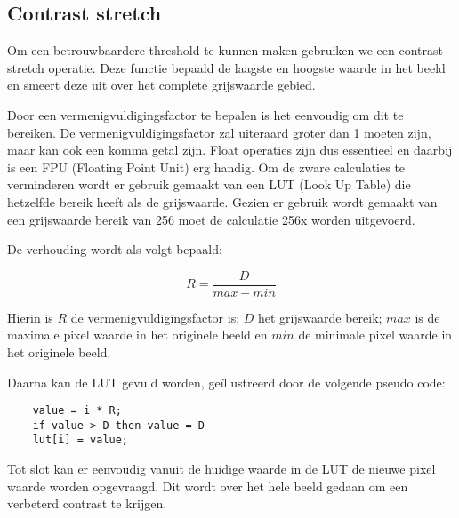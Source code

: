 \subsection{Contrast stretch}

Om een betrouwbaardere threshold te kunnen maken gebruiken we een contrast stretch
operatie. Deze functie bepaald de laagste en hoogste waarde in het beeld en smeert
deze uit over het complete grijswaarde gebied.

Door een vermenigvuldigingsfactor te bepalen is het eenvoudig om dit te
bereiken. De vermenigvuldigingsfactor zal uiteraard groter dan 1 moeten zijn,
maar kan ook een komma getal zijn. Float operaties zijn dus essentieel en
daarbij is een FPU (Floating Point Unit) erg handig. Om de zware calculaties te
verminderen wordt er gebruik gemaakt van een LUT (Look Up Table) die hetzelfde
bereik heeft als de grijswaarde. Gezien er gebruik wordt gemaakt van een
grijswaarde bereik van 256 moet de calculatie 256x worden uitgevoerd.

De verhouding wordt als volgt bepaald:

\[ R = \frac{D}{max - min} \]

Hierin is $R$ de vermenigvuldigingsfactor is; $D$ het grijswaarde bereik; $max$
is de maximale pixel waarde in het originele beeld en $min$ de minimale pixel
waarde in het originele beeld.

Daarna kan de LUT gevuld worden, geïllustreerd door de volgende pseudo code:

\begin{verbatim}
    value = i * R;
    if value > D then value = D
    lut[i] = value;
\end{verbatim}

Tot slot kan er eenvoudig vanuit de huidige waarde in de LUT de nieuwe pixel
waarde worden opgevraagd. Dit wordt over het hele beeld gedaan om een verbeterd
contrast te krijgen.
